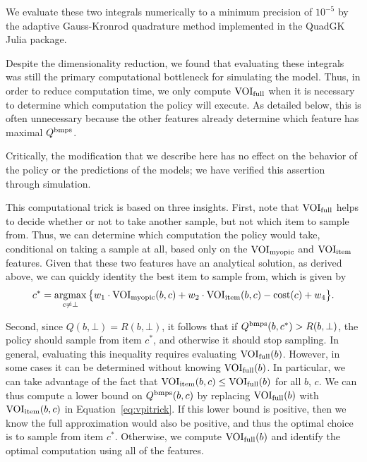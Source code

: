 We evaluate these two integrals numerically to a minimum precision of $10^{-5}$ by the adaptive Gauss-Kronrod quadrature method implemented in the QuadGK Julia package.

Despite the dimensionality reduction, we found that evaluating these integrals was still the primary computational bottleneck for simulating the model. Thus, in order to reduce computation time, we only compute $\text{VOI}_\text{full}$ when it is necessary to determine which computation the policy will execute. As detailed below, this is often unnecessary because the other features already determine which feature has maximal $Q^{\mathrm{bmps}}$.

Critically, the modification that we describe here has no effect on the behavior of the policy or the predictions of the models; we have verified this assertion through simulation.

This computational trick is based on three insights. First, note that $\text{VOI}_\text{full}$ helps to decide whether or not to take another sample, but not which item to sample from. Thus, we can determine which computation the policy would take, conditional on taking a sample at all, based only on the $\text{VOI}_\text{myopic}$ and $\text{VOI}_\text{item}$ features. Given that these two features have an analytical solution, as derived above, we can quickly identity the best item to sample from, which is given by
%
\begin{equation}
\label{eq:vpitrick}
  c^{*}= \operatorname*{argmax}_{c\neq\bot} \big\{ 
    w_{1}\cdot\text{VOI}_\text{myopic}(b,c)+w_{2}\cdot \text{VOI}_\text{item}(b,c)
    - \text{cost}(c)+w_{4} \big\} .
\end{equation}
%

Second, since $Q(b,\bot)=R(b, \bot)$, it follows that if $Q^{\mathrm{bmps}}(b,c^{*})>R(b, \bot)$, the policy should sample from item $c^{*}$, and otherwise it should stop sampling. In general, evaluating this inequality requires evaluating $\text{VOI}_\text{full}(b)$. However, in some cases it can be determined without knowing $\text{VOI}_\text{full}(b)$. In particular, we can take advantage of the fact that $\text{VOI}_\text{item}(b,c)\leq \text{VOI}_\text{full}(b)$ for all $b$, $c$. We can thus compute a lower bound on $Q^{\mathrm{bmps}}(b,c)$ by replacing $\text{VOI}_\text{full}(b)$ with $\text{VOI}_\text{item}(b,c)$ in Equation~\ref{eq:vpitrick}. If this lower bound is positive, then we know the full approximation would also be positive, and thus the optimal choice is to sample from item $c^{*}$. Otherwise, we compute $\text{VOI}_\text{full}(b)$ and identify the optimal computation using all of the features.

